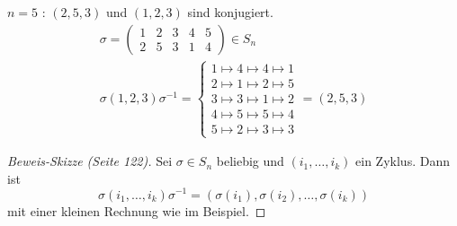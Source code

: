 \begin{eg}
	$n=5$ : $(2,5,3)$ und $(1,2,3)$ sind konjugiert.
	\begin{gather*}
		\sigma = \begin{pmatrix} 
			1 & 2 & 3 & 4 & 5\\
			2 & 5 & 3 & 1 & 4
		\end{pmatrix} \in S_{n}\\ 
		\sigma (1,2,3) \sigma^{-1} = \begin{cases}
			1 \mapsto  4 \mapsto 4 \mapsto 1\\
			2 \mapsto 1 \mapsto 2 \mapsto 5\\
			3 \mapsto 3 \mapsto 1 \mapsto 2\\
			4 \mapsto 5 \mapsto 5 \mapsto 4\\
			5 \mapsto 2 \mapsto 3 \mapsto 3
		\end{cases} = (2,5,3)
	\end{gather*}
\end{eg}

\begin{proof}[Beweis-Skizze (Seite 122)]
	Sei $\sigma \in S_{n}$ beliebig und $(i_1,\ldots,i_{k})$ ein Zyklus.
	Dann ist 
	\[
		\sigma(i_1,\ldots,i_{k}) \sigma^{-1} = (\sigma(i_1),\sigma(i_2),\ldots,\sigma(i_{k}))
	\]
	mit einer kleinen Rechnung wie im Beispiel.
\end{proof}
































